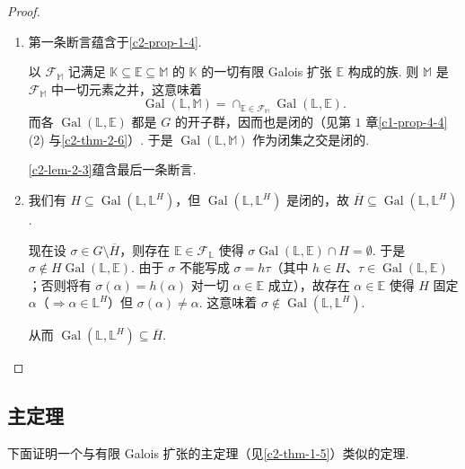 \begin{proof}
\begin{enumerate}
    \item 第一条断言蕴含于\autoref{c2-prop-1-4}.

    以 $\mathcal{F}_{\mathbb{M}}$ 记满足 $\mathbb{K}\subseteq\mathbb{E}\subseteq\mathbb{M}$ 的 $\mathbb{K}$ 的一切有限 Galois 扩张 $\mathbb{E}$ 构成的族. 则 $\mathbb{M}$ 是 $\mathcal{F}_{\mathbb{M}}$ 中一切元素之并，这意味着
    \[
    \operatorname{Gal}(\mathbb{L},\mathbb{M})=\cap_{\mathbb{E}\in\mathcal{F}_{\mathbb{M}}}\operatorname{Gal}(\mathbb{L},\mathbb{E}).
    \]
    而各 $\operatorname{Gal}(\mathbb{L},\mathbb{E})$ 都是 $G$ 的开子群，因而也是闭的（见第 $1$ 章\autoref{c1-prop-4-4}(2) 与\autoref{c2-thm-2-6}）. 于是 $\operatorname{Gal}(\mathbb{L},\mathbb{M})$ 作为闭集之交是闭的.

    \autoref{c2-lem-2-3}蕴含最后一条断言.
    \item 我们有 $H\subseteq\operatorname{Gal}(\mathbb{L},\mathbb{L}^{H})$，但 $\operatorname{Gal}(\mathbb{L},\mathbb{L}^{H})$ 是闭的，故 $\overline{H}\subseteq\operatorname{Gal}(\mathbb{L},\mathbb{L}^{H})$.

    现在设 $\sigma\in G\setminus\overline{H}$，则存在 $\mathbb{E}\in\mathcal{F}_{\mathbb{L}}$ 使得 $\sigma\operatorname{Gal}(\mathbb{L},\mathbb{E})\cap H=\emptyset$. 于是 $\sigma\notin H\operatorname{Gal}(\mathbb{L},\mathbb{E})$. 由于 $\sigma$ 不能写成 $\sigma=h\tau$（其中 $h\in H$、$\tau\in\operatorname{Gal}(\mathbb{L},\mathbb{E})$；否则将有 $\sigma(\alpha)=h(\alpha)$ 对一切 $\alpha\in\mathbb{E}$ 成立），故存在 $\alpha\in\mathbb{E}$ 使得 $H$ 固定 $\alpha$（$\Rightarrow\alpha\in\mathbb{L}^{H}$）但 $\sigma(\alpha)\neq\alpha$. 这意味着 $\sigma\notin\operatorname{Gal}(\mathbb{L},\mathbb{L}^{H})$.

    从而 $\operatorname{Gal}(\mathbb{L},\mathbb{L}^{H})\subseteq\overline{H}$.
\end{enumerate}
\end{proof}

\subsection{主定理}

下面证明一个与有限 Galois 扩张的主定理（见\autoref{c2-thm-1-5}）类似的定理.

